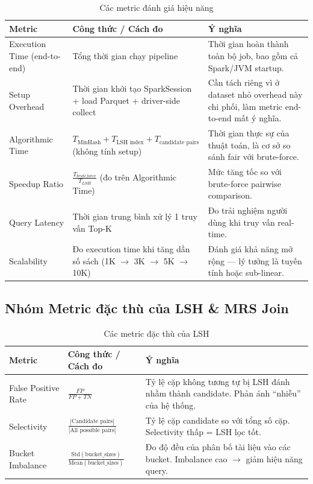 \begin{table}[H]
\centering
\caption{Các metric đánh giá hiệu năng}
\label{tab:performance-metrics}
\begin{tabularx}{\textwidth}{|l|X|X|}
\hline
\textbf{Metric} & \textbf{Công thức / Cách đo} & \textbf{Ý nghĩa} \\
\hline
Execution Time (end-to-end) & Tổng thời gian chạy pipeline & Thời gian hoàn thành toàn bộ job, bao gồm cả Spark/JVM startup. \\
\hline
Setup Overhead & Thời gian khởi tạo SparkSession + load Parquet + driver-side collect & Cần tách riêng vì ở dataset nhỏ overhead này chi phối, làm metric end-to-end mất ý nghĩa. \\
\hline
Algorithmic Time & $T_{\text{MinHash}} + T_{\text{LSH index}} + T_{\text{candidate pairs}}$ (không tính setup) & Thời gian thực sự của thuật toán, là cơ sở so sánh fair với brute-force. \\
\hline
Speedup Ratio & $\frac{T_{bruteforce}}{T_{LSH}}$ (đo trên Algorithmic Time) & Mức tăng tốc so với brute-force pairwise comparison. \\
\hline
Query Latency & Thời gian trung bình xử lý 1 truy vấn Top-K & Đo trải nghiệm người dùng khi truy vấn real-time. \\
\hline
Scalability & Đo execution time khi tăng dần số sách (1K $\rightarrow$ 3K $\rightarrow$ 5K $\rightarrow$ 10K) & Đánh giá khả năng mở rộng --- lý tưởng là tuyến tính hoặc sub-linear. \\
\hline
\end{tabularx}
\end{table}

\subsection{Nhóm Metric đặc thù của LSH \& MRS Join}

\begin{table}[H]
\centering
\caption{Các metric đặc thù của LSH}
\label{tab:lsh-metrics}
\begin{tabularx}{\textwidth}{|l|X|X|}
\hline
\textbf{Metric} & \textbf{Công thức / Cách đo} & \textbf{Ý nghĩa} \\
\hline
False Positive Rate & $\frac{FP}{FP + TN}$ & Tỷ lệ cặp không tương tự bị LSH đánh nhầm thành candidate. Phản ánh ``nhiễu'' của hệ thống. \\
\hline
Selectivity & $\frac{|\text{Candidate pairs}|}{|\text{All possible pairs}|}$ & Tỷ lệ cặp candidate so với tổng số cặp. Selectivity thấp = LSH lọc tốt. \\
\hline
Bucket Imbalance & $\frac{\text{Std}(\text{bucket\_sizes})}{\text{Mean}(\text{bucket\_sizes})}$ & Đo độ đều của phân bố tài liệu vào các bucket. Imbalance cao $\rightarrow$ giảm hiệu năng query. \\
\hline
\end{tabularx}
\end{table}

